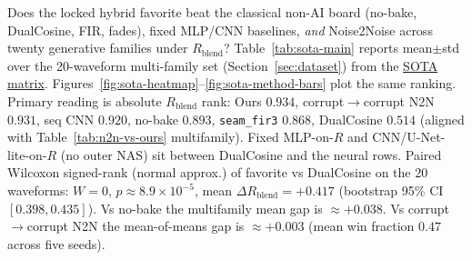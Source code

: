 Does the locked hybrid favorite beat the classical non-AI board (no-bake, DualCosine, FIR, fades),
fixed MLP/CNN baselines, \emph{and} Noise2Noise across twenty generative families under $R_{\mathrm{blend}}$?
Table~\ref{tab:sota-main} reports mean$\pm$std over the 20-waveform multi-family set (Section~\ref{sec:dataset}) from the \href{https://github.com/reeldemo/denoise-opt-meta/blob/master/paper/Unsupervised_Wrap-Discontinuity_Repair_in_Wavetable_Synthesis_via_Hybrid_GA-PPO_Meta-Search_v12/figures/sota_matrix.json}{SOTA matrix}.
Figures~\ref{fig:sota-heatmap}--\ref{fig:sota-method-bars} plot the same ranking.
Primary reading is absolute $R_{\mathrm{blend}}$ rank:
Ours $0.934$, corrupt$\to$corrupt N2N $0.931$, seq CNN $0.920$, no-bake $0.893$,
\texttt{seam\_fir3} $0.868$, DualCosine $0.514$
(aligned with Table~\ref{tab:n2n-vs-ours} multifamily).
Fixed MLP-on-$R$ and CNN/U-Net-lite-on-$R$ (no outer NAS) sit between DualCosine and the neural rows.
Paired Wilcoxon signed-rank (normal approx.) of favorite vs DualCosine on the 20 waveforms: $W{=}0$, $p{\approx}8.9{\times}10^{-5}$, mean $\Delta R_{\mathrm{blend}}{=}{+}0.417$ (bootstrap 95\% CI $[0.398,0.435]$).
Vs no-bake the multifamily mean gap is $\approx{+}0.038$.
Vs corrupt$\to$corrupt N2N the mean-of-means gap is $\approx{+}0.003$ (mean win fraction $0.47$ across five seeds).

